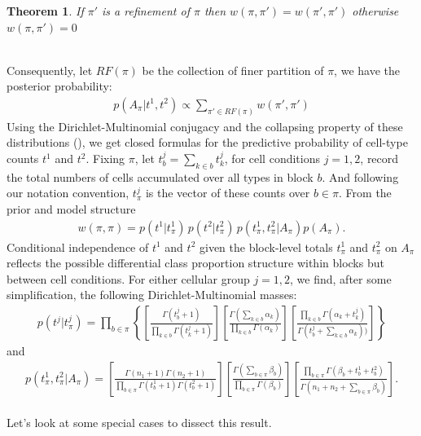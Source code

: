\documentclass[11pt]{amsart}
\newtheorem{theorem}{Theorem}
\begin{document}
\begin{theorem}
If $\pi'$ is a refinement of $\pi$ then $w(\pi,\pi') = w(\pi', \pi')$ otherwise $w(\pi,\pi') = 0$
\end{theorem}
\hfill\\
Consequently, let $RF(\pi)$ be the collection of finer partition of $\pi$, we have 
the posterior probability: 
\[
\begin{split}
p(A_\pi | t^1,t^2)\propto  \sum_{\pi' \in RF(\pi)} w(\pi',\pi')
\end{split}
\]
Using the Dirichlet-Multinomial conjugacy and the collapsing property of
these distributions (\cite{ref:Dickey}), we get closed formulas for the predictive
probability of cell-type counts $t^1$ and $t^2$.  Fixing $\pi$,
let $t^j_b = \sum_{k\in b} t^j_k$, for cell conditions $j=1,2$, 
record the total numbers of cells accumulated over all types in block $b$.
And following our notation convention, $t^j_\pi$ is the vector of these
counts over $b \in \pi$.  From the prior and model structure
\begin{eqnarray*}
w(\pi, \pi) = p(t^1 | t^1_{\pi})\, p(t^2|  t^2_{\pi} )
 \, p( t^1_{\pi}, t^2_{\pi} | A_{\pi} ) p(A_{\pi}).
\end{eqnarray*}
Conditional independence of $t^1$ and $t^2$ given the block-level totals
$t^1_{\pi}$ and $t^2_{\pi}$ on $A_{\pi}$ reflects the possible differential 
class proportion structure within blocks but between cell conditions.
For either cellular group $j=1,2$,
we find, after some simplification, the following Dirichlet-Multinomial masses: 
\begin{align}
p(t^j | t^j_{\pi}) = \prod_{b \in \pi} \left\{
\left[ \frac{ \Gamma(t^j_b +1 ) }{\prod_{k \in b} \Gamma( t^j_k + 1 ) } 
\right]
\left[ \frac{\Gamma( \sum_{k \in b} \alpha_k )}{
		\prod_{k\in b} \Gamma( \alpha_k ) } \right] 
       \left[        \frac{ \prod_{k \in b} \Gamma(\alpha_k + t^j_k)  }{
		\Gamma(t^j_b + \sum_{k\in b} \alpha_k ) )}\right]
 \right\}
\end{align}
and
\begin{align}
p(t^1_{\pi},t^2_{\pi}| A_{\pi}) =
 \left[ \frac{ \Gamma(n_1+1) \Gamma(n_2+1) }{ \prod_{b \in \pi} \Gamma(t^1_b+1) 
   \Gamma( t^2_b + 1 )} \right] 
\left[ \frac{\Gamma( \sum_{b \in \pi} \beta_b  )}{
   \prod_{b \in \pi} \Gamma(\beta_b )} \right] 
 \left[ \frac{ \prod_{b \in \pi} \Gamma( \beta_b + t^1_b + t^2_b )}{
	\Gamma( n_1 + n_2 + \sum_{b \in \pi} \beta_b  )} \right].
\end{align}
\hfill\\
Let's look at some special cases to dissect this result. \\
\end{document}
